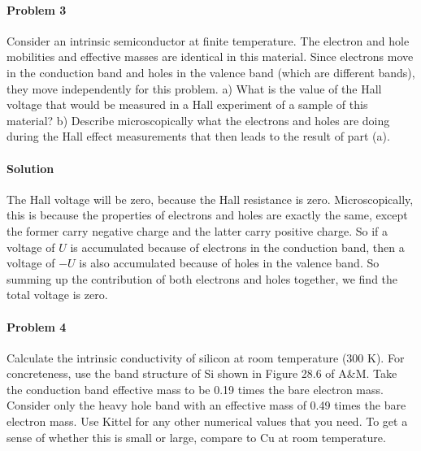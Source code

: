 \documentclass[hyperref, a4paper]{article}
\begin{document}
\paragraph{Problem 3} Consider an intrinsic semiconductor at finite temperature. The electron and hole mobilities and effective masses are identical in this material. Since electrons move in the conduction band and holes in the valence band (which are different bands), they move independently for this problem.
a) What is the value of the Hall voltage that would be measured in a Hall experiment of a sample of this material?
b) Describe microscopically what the electrons and holes are doing during the Hall effect measurements that then leads to the result of part (a).

\paragraph{Solution} The Hall voltage will be zero, 
because the Hall resistance is zero.
Microscopically, this is because the properties of electrons and holes are exactly the same,
except the former carry negative charge and the latter carry positive charge.
So if a voltage of $U$ is accumulated because of electrons in the conduction band,
then a voltage of $-U$ is also accumulated because of holes in the valence band.
So summing up the contribution of both electrons and holes together,
we find the total voltage is zero.

\paragraph{Problem 4} Calculate the intrinsic conductivity of silicon at room temperature (300 K).  
For concreteness, use the band structure of Si shown in Figure 28.6 of A\&M.  
Take the conduction band effective mass to be 0.19 times the bare electron mass.  
Consider only the heavy hole band with an effective mass of 0.49 times the bare electron mass.  
Use Kittel for any other numerical values that you need.  
To get a sense of whether this is small or large, compare to Cu at room temperature. 
\end{document}
